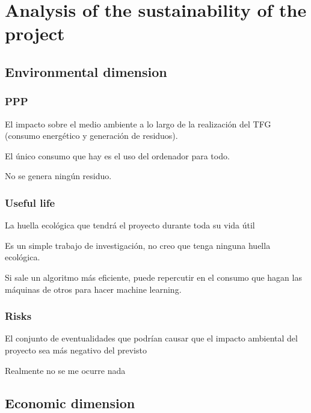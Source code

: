 \documentclass[a4paper]{article}
\begin{document}
    \section{Analysis of the sustainability of the project}
        \subsection{Environmental dimension}
            \subsubsection{PPP}
            El impacto sobre el medio ambiente a lo largo de la realización del TFG (consumo energético y generación de residuos).

            El único consumo que hay es el uso del ordenador para todo.

            No se genera ningún residuo.
            \subsubsection{Useful life}

            La huella ecológica que tendrá el proyecto durante toda su vida útil

            Es un simple trabajo de investigación, no creo que tenga ninguna huella ecológica.

            Si sale un algoritmo más eficiente, puede repercutir en el consumo que hagan las máquinas de otros para hacer machine learning.

            \subsubsection{Risks}

            El conjunto de eventualidades que podrían causar que el impacto ambiental del proyecto sea más negativo del previsto

            Realmente no se me ocurre nada



        \subsection{Economic dimension}
\end{document}
